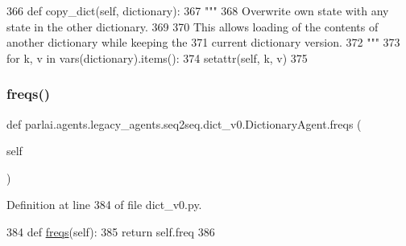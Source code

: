 \begin{DoxyCode}
366     \textcolor{keyword}{def }copy\_dict(self, dictionary):
367         \textcolor{stringliteral}{"""}
368 \textcolor{stringliteral}{        Overwrite own state with any state in the other dictionary.}
369 \textcolor{stringliteral}{}
370 \textcolor{stringliteral}{        This allows loading of the contents of another dictionary while keeping the}
371 \textcolor{stringliteral}{        current dictionary version.}
372 \textcolor{stringliteral}{        """}
373         \textcolor{keywordflow}{for} k, v \textcolor{keywordflow}{in} vars(dictionary).items():
374             setattr(self, k, v)
375 
\end{DoxyCode}
\mbox{\label{classparlai_1_1agents_1_1legacy__agents_1_1seq2seq_1_1dict__v0_1_1DictionaryAgent_a651f3045cd1e5237e7e5a1b54cc5f1c9}} 
\subsubsection{\texorpdfstring{freqs()}{freqs()}}
{\footnotesize\ttfamily def parlai.\+agents.\+legacy\+\_\+agents.\+seq2seq.\+dict\+\_\+v0.\+Dictionary\+Agent.\+freqs (\begin{DoxyParamCaption}\item[{}]{self }\end{DoxyParamCaption})}



Definition at line 384 of file dict\+\_\+v0.\+py.


\begin{DoxyCode}
384     \textcolor{keyword}{def }\hyperlink{namespaceparlai_1_1agents_1_1tfidf__retriever_1_1build__tfidf_abb3607652abdd76d57a6ae90e19e3828}{freqs}(self):
385         \textcolor{keywordflow}{return} self.freq
386 
\end{DoxyCode}
\mbox{\label{classparlai_1_1agents_1_1legacy__agents_1_1seq2seq_1_1dict__v0_1_1DictionaryAgent_a6f403715cffdfde531b83a9bf6e0f750}} 
